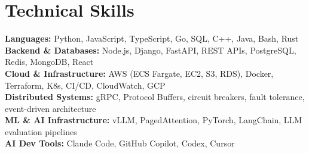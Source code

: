 \documentclass[letterpaper,11pt]{article}
\begin{document}
\section{Technical Skills}
\vspace{-7pt}
\begin{itemize}[leftmargin=0.15in, label={}]\small{\item{
\textbf{Languages:} Python, JavaScript, TypeScript, Go, SQL, C++, Java, Bash, Rust \\
\textbf{Backend \& Databases:} Node.js, Django, FastAPI, REST APIs, PostgreSQL, Redis, MongoDB, React \\
\textbf{Cloud \& Infrastructure:} AWS (ECS Fargate, EC2, S3, RDS), Docker, Terraform, K8s, CI/CD, CloudWatch, GCP \\
\textbf{Distributed Systems:} gRPC, Protocol Buffers, circuit breakers, fault tolerance, event-driven architecture \\
\textbf{ML \& AI Infrastructure:} vLLM, PagedAttention, PyTorch, LangChain, LLM evaluation pipelines \\
\textbf{AI Dev Tools:} Claude Code, GitHub Copilot, Codex, Cursor
}}
\end{itemize}
\end{document}
